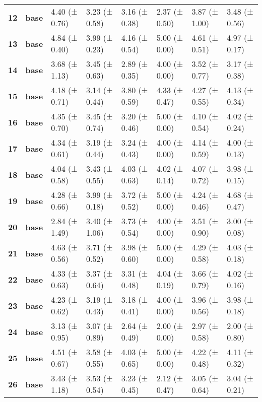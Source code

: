 \begin{longtable}{llllllll}
\cline{1-8}
\textbf{12} & \textbf{base} & 4.40 (± 0.76) & 3.23 (± 0.58) & 3.16 (± 0.38) & 2.37 (± 0.50) & 3.87 (± 1.00) & 3.48 (± 0.56) \\
\cline{1-8}
\textbf{13} & \textbf{base} & 4.84 (± 0.40) & 3.99 (± 0.23) & 4.16 (± 0.54) & 5.00 (± 0.00) & 4.61 (± 0.51) & 4.97 (± 0.17) \\
\cline{1-8}
\textbf{14} & \textbf{base} & 3.68 (± 1.13) & 3.45 (± 0.63) & 2.89 (± 0.35) & 4.00 (± 0.00) & 3.52 (± 0.77) & 3.17 (± 0.38) \\
\cline{1-8}
\textbf{15} & \textbf{base} & 4.18 (± 0.71) & 3.14 (± 0.44) & 3.80 (± 0.59) & 4.33 (± 0.47) & 4.27 (± 0.55) & 4.13 (± 0.34) \\
\cline{1-8}
\textbf{16} & \textbf{base} & 4.35 (± 0.70) & 3.45 (± 0.74) & 3.20 (± 0.46) & 5.00 (± 0.00) & 4.10 (± 0.54) & 4.02 (± 0.24) \\
\cline{1-8}
\textbf{17} & \textbf{base} & 4.34 (± 0.61) & 3.19 (± 0.44) & 3.24 (± 0.43) & 4.00 (± 0.00) & 4.14 (± 0.59) & 4.00 (± 0.13) \\
\cline{1-8}
\textbf{18} & \textbf{base} & 4.04 (± 0.58) & 3.43 (± 0.55) & 4.03 (± 0.63) & 4.02 (± 0.14) & 4.07 (± 0.72) & 3.98 (± 0.15) \\
\cline{1-8}
\textbf{19} & \textbf{base} & 4.28 (± 0.66) & 3.99 (± 0.18) & 3.72 (± 0.52) & 5.00 (± 0.00) & 4.24 (± 0.46) & 4.68 (± 0.47) \\
\cline{1-8}
\textbf{20} & \textbf{base} & 2.84 (± 1.49) & 3.40 (± 1.06) & 3.73 (± 0.54) & 4.00 (± 0.00) & 3.51 (± 0.90) & 3.00 (± 0.08) \\
\cline{1-8}
\textbf{21} & \textbf{base} & 4.63 (± 0.56) & 3.71 (± 0.52) & 3.98 (± 0.60) & 5.00 (± 0.00) & 4.29 (± 0.58) & 4.03 (± 0.18) \\
\cline{1-8}
\textbf{22} & \textbf{base} & 4.33 (± 0.63) & 3.37 (± 0.64) & 3.31 (± 0.48) & 4.04 (± 0.19) & 3.66 (± 0.79) & 4.02 (± 0.16) \\
\cline{1-8}
\textbf{23} & \textbf{base} & 4.23 (± 0.62) & 3.19 (± 0.43) & 3.18 (± 0.41) & 4.00 (± 0.00) & 3.96 (± 0.56) & 3.98 (± 0.18) \\
\cline{1-8}
\textbf{24} & \textbf{base} & 3.13 (± 0.95) & 3.07 (± 0.89) & 2.64 (± 0.49) & 2.00 (± 0.00) & 2.97 (± 0.58) & 2.00 (± 0.80) \\
\cline{1-8}
\textbf{25} & \textbf{base} & 4.51 (± 0.67) & 3.58 (± 0.55) & 4.03 (± 0.65) & 5.00 (± 0.00) & 4.22 (± 0.48) & 4.11 (± 0.32) \\
\cline{1-8}
\textbf{26} & \textbf{base} & 3.43 (± 1.18) & 3.53 (± 0.54) & 3.23 (± 0.45) & 2.12 (± 0.47) & 3.05 (± 0.64) & 3.04 (± 0.21) \\

\end{longtable}
